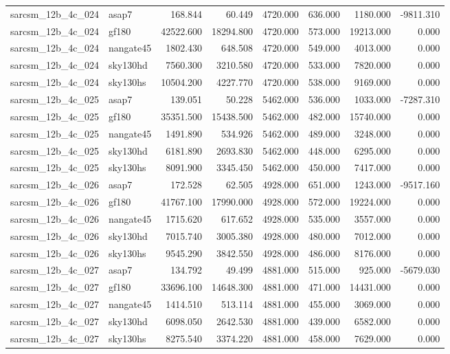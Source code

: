 \begin{tabular}{llrrrrrr}
sarcsm\_12b\_4c\_024 & asap7 & 168.844 & 60.449 & 4720.000 & 636.000 & 1180.000 & -9811.310 \\
sarcsm\_12b\_4c\_024 & gf180 & 42522.600 & 18294.800 & 4720.000 & 573.000 & 19213.000 & 0.000 \\
sarcsm\_12b\_4c\_024 & nangate45 & 1802.430 & 648.508 & 4720.000 & 549.000 & 4013.000 & 0.000 \\
sarcsm\_12b\_4c\_024 & sky130hd & 7560.300 & 3210.580 & 4720.000 & 533.000 & 7820.000 & 0.000 \\
sarcsm\_12b\_4c\_024 & sky130hs & 10504.200 & 4227.770 & 4720.000 & 538.000 & 9169.000 & 0.000 \\
sarcsm\_12b\_4c\_025 & asap7 & 139.051 & 50.228 & 5462.000 & 536.000 & 1033.000 & -7287.310 \\
sarcsm\_12b\_4c\_025 & gf180 & 35351.500 & 15438.500 & 5462.000 & 482.000 & 15740.000 & 0.000 \\
sarcsm\_12b\_4c\_025 & nangate45 & 1491.890 & 534.926 & 5462.000 & 489.000 & 3248.000 & 0.000 \\
sarcsm\_12b\_4c\_025 & sky130hd & 6181.890 & 2693.830 & 5462.000 & 448.000 & 6295.000 & 0.000 \\
sarcsm\_12b\_4c\_025 & sky130hs & 8091.900 & 3345.450 & 5462.000 & 450.000 & 7417.000 & 0.000 \\
sarcsm\_12b\_4c\_026 & asap7 & 172.528 & 62.505 & 4928.000 & 651.000 & 1243.000 & -9517.160 \\
sarcsm\_12b\_4c\_026 & gf180 & 41767.100 & 17990.000 & 4928.000 & 572.000 & 19224.000 & 0.000 \\
sarcsm\_12b\_4c\_026 & nangate45 & 1715.620 & 617.652 & 4928.000 & 535.000 & 3557.000 & 0.000 \\
sarcsm\_12b\_4c\_026 & sky130hd & 7015.740 & 3005.380 & 4928.000 & 480.000 & 7012.000 & 0.000 \\
sarcsm\_12b\_4c\_026 & sky130hs & 9545.290 & 3842.550 & 4928.000 & 486.000 & 8176.000 & 0.000 \\
sarcsm\_12b\_4c\_027 & asap7 & 134.792 & 49.499 & 4881.000 & 515.000 & 925.000 & -5679.030 \\
sarcsm\_12b\_4c\_027 & gf180 & 33696.100 & 14648.300 & 4881.000 & 471.000 & 14431.000 & 0.000 \\
sarcsm\_12b\_4c\_027 & nangate45 & 1414.510 & 513.114 & 4881.000 & 455.000 & 3069.000 & 0.000 \\
sarcsm\_12b\_4c\_027 & sky130hd & 6098.050 & 2642.530 & 4881.000 & 439.000 & 6582.000 & 0.000 \\
sarcsm\_12b\_4c\_027 & sky130hs & 8275.540 & 3374.220 & 4881.000 & 458.000 & 7629.000 & 0.000 \\

\end{tabular}
